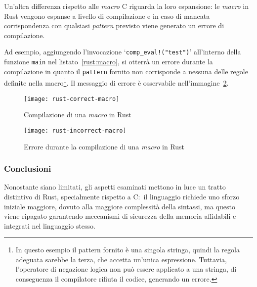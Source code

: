 Un'altra differenza rispetto alle \textit{macro} C riguarda la loro espansione: le \textit{macro} in Rust vengono espanse a livello di compilazione e in caso di mancata
corrispondenza con qualsiasi \textit{pattern} previsto viene generato un errore di compilazione.

Ad esempio, aggiungendo l'invocazione `\texttt{comp\_eval!("test")}' all'interno della funzione \texttt{main} nel listato~\ref{rust:macro}, si otterrà un errore
durante la compilazione in quanto il \texttt{pattern} fornito non corrisponde a nessuna delle regole definite nella macro\footnote{In questo esempio il pattern fornito è una singola stringa, quindi la regola adeguata sarebbe la terza, che accetta un'unica espressione. Tuttavia, l'operatore di negazione logica non può essere applicato a una stringa, di conseguenza il compilatore rifiuta il codice, generando un errore.}.
Il messaggio di errore è osservabile nell'immagine~\ref{rust:incorrect-macro}.
\begin{figure}[htbp]
    \begin{center}
        \texttt{[image: rust-correct-macro]}
        \caption{Compilazione di una \textit{macro} in Rust}\label{rust:correct-macro}
    \end{center}
\end{figure}
\begin{figure}[htbp]
    \begin{center}
        \texttt{[image: rust-incorrect-macro]}
        \caption{Errore durante la compilazione di una \textit{macro} in Rust}\label{rust:incorrect-macro}
    \end{center}
\end{figure}

\subsubsection{Conclusioni}
Nonostante siano limitati, gli aspetti esaminati mettono in luce un tratto distintivo di Rust, specialmente rispetto a C:\ il linguaggio
richiede uno sforzo iniziale maggiore, dovuto alla maggiore complessità della sintassi, ma questo viene ripagato garantendo meccanismi 
di sicurezza della memoria affidabili e integrati nel linguaggio stesso.